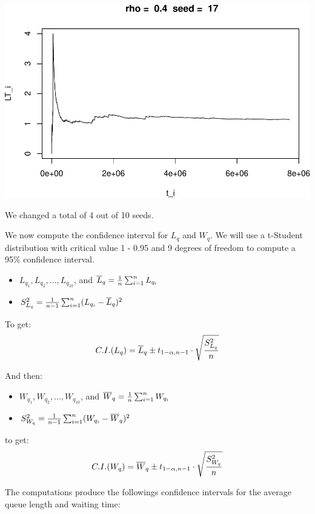 \documentclass[]{article}
\providecommand{\tightlist}{%
  \setlength{\itemsep}{0pt}\setlength{\parskip}{0pt}}
\begin{document}
\includegraphics{003_files/figure-latex/unnamed-chunk-14-10.pdf}

We changed a total of 4 out of 10 seeds.

We now compute the confidence interval for \(L_{q}\) and \(W_{q}\). We
will use a t-Student distribution with critical value 1 - 0.95 and 9
degrees of freedom to compute a 95\% confidence interval.

\begin{itemize}
\tightlist
\item
  \(L_{q_{1}},L_{q_{2}},...,L_{q_{10}}\), and
  \(\overline{L}_{q} = {1 \over n}\sum_{i=1}^{n}L_{q_{i}}\)
\item
  \(S_{L_{q}}^{2} = {1 \over n - 1} \sum_{i=1}^{n} ( L_{q_{i}} - \overline{L}_{q} )^{2}\)
\end{itemize}

To get:
\[C.I.(L_{q}) =   \overline{L}_{q} \pm t_{1 - \alpha, n - 1} \cdot \sqrt{S_{L_{q}}^{2} \over n}\]

And then:

\begin{itemize}
\tightlist
\item
  \(W_{q_{1}},W_{q_{2}},...,W_{q_{10}}\), and
  \(\overline{W}_{q} = {1 \over n}\sum_{i=1}^{n}W_{q_{i}}\)
\item
  \(S_{W_{q}}^{2} = {1 \over n - 1} \sum_{i=1}^{n} ( W_{q_{i}} - \overline{W}_{q} )^{2}\)
\end{itemize}

to get:
\[ C.I.(W_{q}) =   \overline{W}_{q} \pm t_{1 - \alpha, n - 1} \cdot \sqrt{S_{W_{q}}^{2} \over n}\]

The computations produce the followings confidence intervals for the
average queue length and waiting time:
\end{document}
